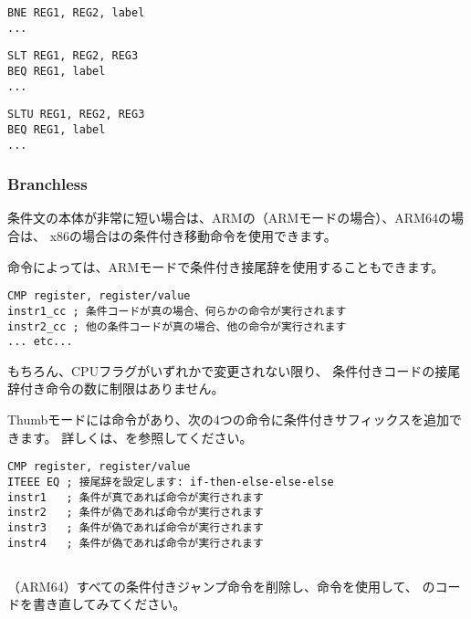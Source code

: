 \begin{lstlisting}[caption=Check for non-equal values,style=customasmMIPS]
BNE REG1, REG2, label
...
\end{lstlisting}

\begin{lstlisting}[caption=Check for less than (signed),style=customasmMIPS]
SLT REG1, REG2, REG3
BEQ REG1, label
...
\end{lstlisting}

\begin{lstlisting}[caption=Check for less than (unsigned),style=customasmMIPS]
SLTU REG1, REG2, REG3
BEQ REG1, label
...
\end{lstlisting}

\subsubsection{Branchless}

条件文の本体が非常に短い場合は、ARMの（ARMモードの場合）、ARM64の場合は、
x86の場合はの条件付き移動命令を使用できます。


命令によっては、ARMモードで条件付き接尾辞を使用することもできます。

\begin{lstlisting}[caption=ARM (\ARMMode),style=customasmARM]
CMP register, register/value
instr1_cc ; 条件コードが真の場合、何らかの命令が実行されます
instr2_cc ; 他の条件コードが真の場合、他の命令が実行されます
... etc...
\end{lstlisting}

もちろん、CPUフラグがいずれかで変更されない限り、
条件付きコードの接尾辞付き命令の数に制限はありません。


Thumbモードには命令があり、次の4つの命令に条件付きサフィックスを追加できます。
詳しくは、を参照してください。

\begin{lstlisting}[caption=ARM (\ThumbMode),style=customasmARM]
CMP register, register/value
ITEEE EQ ; 接尾辞を設定します: if-then-else-else-else
instr1   ; 条件が真であれば命令が実行されます
instr2   ; 条件が偽であれば命令が実行されます
instr3   ; 条件が偽であれば命令が実行されます
instr4   ; 条件が偽であれば命令が実行されます
\end{lstlisting}

\subsection{\Exercise}

（ARM64）すべての条件付きジャンプ命令を削除し、命令を使用して、
 のコードを書き直してみてください。
